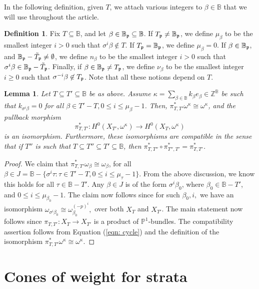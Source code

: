 \documentclass[11pt,pdflatex]{amsart}
\theoremstyle{plain}
\newtheorem{lemma}[theorem]{Lemma}
\theoremstyle{definition}
\newcommand{\ZZ}{\mathbf{Z}}
\theoremstyle{plain}
\theoremstyle{definition}
\newtheorem{dfn}[theorem]{Definition}
\theoremstyle{remark}
\numberwithin{equation}{section}
\numberwithin{figure}{section} \numberwithin{table}{subsection}
\newcommand{\gerp}{{\frak{p}}}
\def\BB{\mathbb{B}}
\def\PP{\mathbb{P}}
\def\ZZ{\mathbb{Z}}
\begin{document}
In the following definition, given $T$, we attach various  integers to $\beta \in \BB$ that we will use throughout the article.
\begin{dfn}\label{definition: mu}
Fix $T \subseteq \BB$, and let $\beta \in \BB_\gerp \subseteq \BB$. If $T_\gerp\neq\BB_\gerp$, we define $\mu_\beta$ to be  the smallest integer $i> 0$ such that $\sigma^i\beta \not \in T$. If $T_\gerp=\BB_\gerp$, we define $\mu_\beta=0$.  If $\beta \in \BB_\gerp$, and $\BB_\gerp-\tilde{T}_\gerp \neq \emptyset$, we define $n_\beta$ to be the smallest integer $i>0$ such that $\sigma^i\beta \in \BB_\gerp-\tilde{T}_\gerp$. Finally, if $\beta \in \BB_\gerp \neq T_\gerp$,  we define $\nu_\beta$ to be the smallest integer $i\geq0$ such that $\sigma^{-i}\beta \not \in T_\gerp$. Note that all these notions depend on $T$.\end{dfn}

 \begin{lemma}\label{lemma: pullback} Let $T \subseteq T' \subseteq \BB$ be as above. Assume $\kappa=\sum_{\beta \in \BB}k_\beta e_\beta \in \ZZ^\BB$ be such that $k_{\sigma^i\beta}=0$ for all $\beta \in T'-T, 0\leq i \leq \mu_\beta-1$. Then,  $\pi_{T,T'}^*\omega^\kappa \cong \omega^\kappa$, and the pullback morphism
 $$\pi^*_{T,T'}: H^0(X_{T'}, \omega^\kappa) \rightarrow H^0(X_T, \omega^\kappa)$$
 is an isomorphism.  Furthermore, these isomorphisms are compatible in the sense that if $T''$ is such that $T \subseteq T'' \subseteq T' \subseteq \BB$, then $\pi_{T,T''}^*\circ \pi_{T'',T'}^* = \pi_{T,T'}^*$.
 \end{lemma}
 
\begin{proof} We claim that $\pi^*_{T,T'}\omega_\beta \cong \omega_\beta$, for all $\beta \in J=\BB-\{\sigma^i\tau: \tau \in T'-T, 0\leq i \leq \mu_\tau-1\}$. From the above discussion, we know this holds for all $\tau \in \BB-T'$. Any  $\beta \in J$ is of the form $\sigma^i\beta_0$, where $\beta_0 \in \BB-T'$, and $0 \leq i \leq \mu_{\beta_0}-1$. The claim now follows since for such $\beta_0,i,$ we have an isomorphism $\omega_{\sigma^i\beta_0} \cong \omega_{\beta_0}^{(-p)^i},$ over both $X_T$ and $X_{T'}$. The main statement now  follows since $\pi_{T,T'}: X_T \rightarrow X_{T'}$ is a product of $\PP^1$-bundles.  The compatibility assertion follows from Equation (\ref{eqn: cycle}) and the definition of the  isomorphism $\pi_{T,T'}^*\omega^\kappa \cong \omega^\kappa$.
\end{proof}


\section{Cones of weight for strata}
\end{document}
